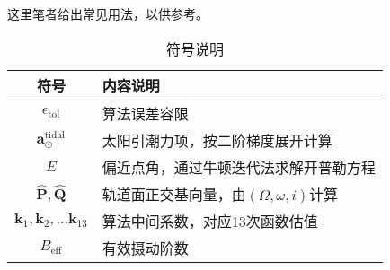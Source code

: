 这里笔者给出常见用法，以供参考。

\begin{table}[H]
    \caption{符号说明}
    \vspace{-6pt}
    \centering
    \begin{tabularx}{0.9\textwidth}{c| >{\raggedright\arraybackslash}X}
        \toprule[1.5pt]
        \textbf{符号} & \textbf{内容说明} \\
        \midrule[1pt]
      
        $\epsilon_\mathrm{tol}$ & 算法误差容限 \\
        $\mathbf{a}_\odot^\mathrm{tidal}$ & 太阳引潮力项，按二阶梯度展开计算 \\
        $E$ & 偏近点角，通过牛顿迭代法求解开普勒方程 \\
        $\mathbf{\hat{P}},\mathbf{\hat{Q}}$ & 轨道面正交基向量，由$(\Omega,\omega,i)$计算 \\
        $\mathbf{k}_1,\mathbf{k}_2,...\mathbf{k}_{13}$ & 算法中间系数，对应13次函数估值 \\
        $B_{\mathrm{eff}}$ & 有效摄动阶数 \\
        \bottomrule[1.5pt]
    \end{tabularx}
\end{table}


